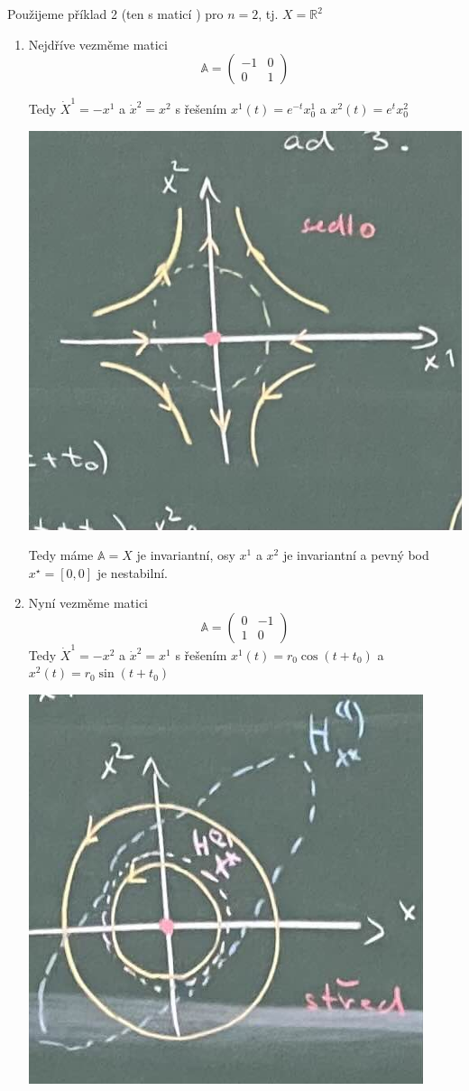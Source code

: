 \documentclass[../main.tex]{subfiles}
\begin{document}
\begin{example}
    Použijeme příklad 2 (ten s maticí ) pro $n=2$, tj. $X=\mathbb{R}^2$
    
\begin{enumerate}
    \item Nejdříve vezměme matici 
    \begin{equation}
        \mathbb{A} = \begin{pmatrix}
            -1 & 0 \\
            0 & 1 
            \end{pmatrix}
    \end{equation}

    Tedy $\dot{X}^1 = - x^1$ a $\dot{x}^2 = x^2$ s řešením $x^1(t) = e^{-t}x^1_0$ a $x^2(t) = e^t x_0^2$

    \begin{center}
        \includegraphics[width=0.5\linewidth]{images/sedlo.jpg}
    \end{center}

    Tedy máme $\mathbb{A}=X$ je invariantní, osy $x^1$ a $x^2$ je invariantní a pevný bod $x^\star = [0,0]$ je nestabilní.


    \item Nyní vezměme matici 
    \begin{equation}
        \mathbb{A} = \begin{pmatrix}
            0 & -1 \\
            1 & 0 
            \end{pmatrix}
    \end{equation}
    Tedy $\dot{X}^1 = - x^2$ a $\dot{x}^2 = x^1$ s řešením $x^1(t) = r_0 \cos(t+t_0)$ a $x^2(t) = r_0 \sin(t+t_0)$
    \begin{center}
        \includegraphics[width=0.5\linewidth]{images/stred.jpg}
    \end{center}


\end{enumerate}
\end{example}
\end{document}
